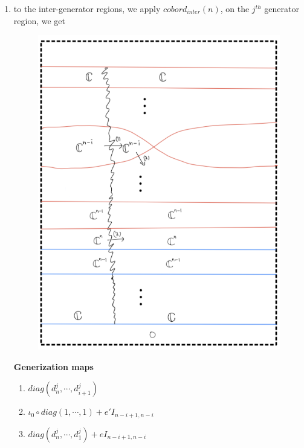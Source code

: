 \begin{enumerate}[label = (Step \arabic*)]
\pagebreak
\item to the inter-generator regions, we apply $cobord_{inter}(n)$, on the $j^{th}$ generator region, we get
\begin{figure}[H]
    \centering
    \includegraphics[scale = 0.85]{diagrams/cobord_full/5.png}
    \caption{}
    \label{fig:your-label}
\end{figure}
\textbf{Generization maps}
\begin{enumerate}
\item $diag(d^j_n,\cdots, d^j_{i+1})$
\item $\iota_0 \circ diag(1,\cdots, 1) + e'I_{n-i+1,n-i}$
\item $diag(d^j_n,\cdots, d^j_{1})+ eI_{n-i+1,n-i}$
\end{enumerate}


\end{enumerate}
